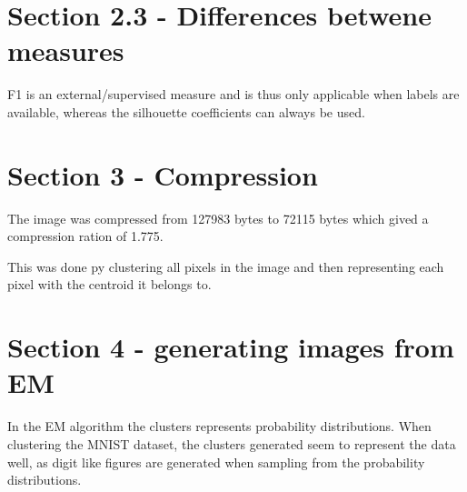 \documentclass[paper=a4, fontsize=11pt]{scrartcl} %
\numberwithin{equation}{section} %
\numberwithin{figure}{section} %
\numberwithin{table}{section} %
\begin{document}
\section*{Section 2.3 - Differences betwene measures}
F1 is an external/supervised measure and is thus only applicable when labels are available, whereas the silhouette coefficients can always be used.

\section*{Section 3 - Compression}
The image was compressed from 127983 bytes to 72115 bytes which gived a compression ration of 1.775.

This was done py clustering all pixels in the image and then representing each pixel with the centroid it belongs to.

\section*{Section 4 - generating images from EM}
In the EM algorithm the clusters represents probability distributions. When clustering the MNIST dataset, the clusters generated seem to represent the data well, as digit like figures are generated when sampling from the probability distributions.
\end{document}
